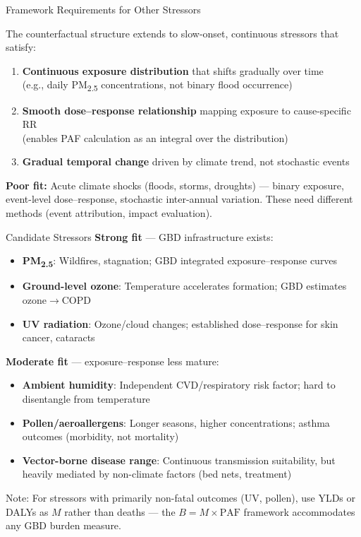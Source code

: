 \documentclass[aspectratio=169,10pt]{beamer}
\begin{document}
\begin{frame}{Framework Requirements for Other Stressors}

  The counterfactual structure extends to \alert{slow-onset, continuous stressors} that satisfy:

  \vspace{0.5em}
  \begin{enumerate}
    \item \textbf{Continuous exposure distribution} that shifts gradually over time\\
      {\small (e.g., daily PM\textsubscript{2.5} concentrations, not binary flood occurrence)}
    \item \textbf{Smooth dose--response relationship} mapping exposure to cause-specific RR\\
      {\small (enables PAF calculation as an integral over the distribution)}
    \item \textbf{Gradual temporal change} driven by climate trend, not stochastic events
  \end{enumerate}

  \vspace{0.5em}
  \textbf{Poor fit:} Acute climate shocks (floods, storms, droughts) --- binary exposure, event-level dose--response, stochastic inter-annual variation. These need different methods (event attribution, impact evaluation).
\end{frame}

\begin{frame}{Candidate Stressors}
  \textbf{Strong fit} --- GBD infrastructure exists:
  \begin{itemize}
    \item \textbf{PM\textsubscript{2.5}}: Wildfires, stagnation; GBD integrated exposure--response curves
    \item \textbf{Ground-level ozone}: Temperature accelerates formation; GBD estimates ozone$\to$COPD
    \item \textbf{UV radiation}: Ozone/cloud changes; established dose--response for skin cancer, cataracts
  \end{itemize}

  \vspace{0.3em}
  \textbf{Moderate fit} --- exposure--response less mature:
  \begin{itemize}
    \item \textbf{Ambient humidity}: Independent CVD/respiratory risk factor; hard to disentangle from temperature
    \item \textbf{Pollen/aeroallergens}: Longer seasons, higher concentrations; asthma outcomes (morbidity, not mortality)
    \item \textbf{Vector-borne disease range}: Continuous transmission suitability, but heavily mediated by non-climate factors (bed nets, treatment)
  \end{itemize}

  \vspace{0.3em}
  {\small Note: For stressors with primarily non-fatal outcomes (UV, pollen), use YLDs or DALYs as $M$ rather than deaths --- the $B = M \times \text{PAF}$ framework accommodates any GBD burden measure.}
\end{frame}
\end{document}
